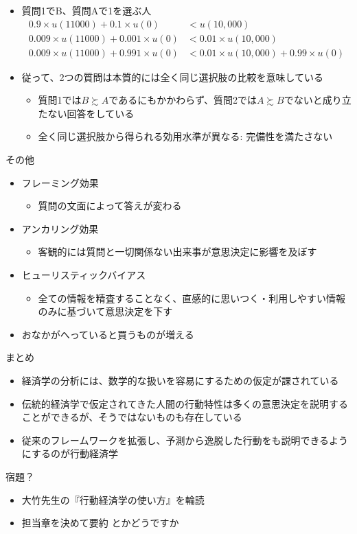 \documentclass[dvipdfmx,11pt]{beamer}
\begin{document}
\begin{frame}{}
  \begin{itemize}
    \item 質問1でB、質問Aで1を選ぶ人
    \begin{align*}
      0.9 \times u(11000) + 0.1 \times u(0) &< u(10,000) \\
      0.009 \times u(11000) + 0.001 \times u(0) &< 0.01 \times u(10,000) \\
      0.009 \times u(11000) + 0.991 \times u(0) &< 0.01 \times u(10,000) + 0.99 \times u(0)
    \end{align*}
    \item 従って、2つの質問は本質的には全く同じ選択肢の比較を意味している
    \begin{itemize}
      \item 質問1では$B \succsim A$であるにもかかわらず、質問2では$A \succsim B$でないと成り立たない回答をしている
      \item 全く同じ選択肢から得られる効用水準が異なる: 完備性を満たさない
    \end{itemize}
  \end{itemize}
\end{frame}

\begin{frame}{その他}
  \begin{itemize}
    \item フレーミング効果
    \begin{itemize}
      \item 質問の文面によって答えが変わる
    \end{itemize}
    \item アンカリング効果
    \begin{itemize}
      \item 客観的には質問と一切関係ない出来事が意思決定に影響を及ぼす
    \end{itemize}
    \item ヒューリスティックバイアス
    \begin{itemize}
      \item 全ての情報を精査することなく、直感的に思いつく・利用しやすい情報のみに基づいて意思決定を下す
    \end{itemize}
    \item おなかがへっていると買うものが増える
  \end{itemize}
\end{frame}

\begin{frame}{まとめ}
  \begin{itemize}
    \item 経済学の分析には、数学的な扱いを容易にするための仮定が課されている
    \item 伝統的経済学で仮定されてきた人間の行動特性は多くの意思決定を説明することができるが、そうではないものも存在している
    \item 従来のフレームワークを拡張し、予測から逸脱した行動をも説明できるようにするのが行動経済学
  \end{itemize}
\end{frame}

\begin{frame}{宿題？}
  \begin{itemize}
    \item 大竹先生の『行動経済学の使い方』を輪読
    \item 担当章を決めて要約
    とかどうですか
  \end{itemize}
\end{frame}
\end{document}

